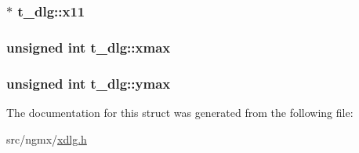 \hypertarget{structt__dlg_abc3b53346014e4a820f11e6f06450201}{
\subsubsection[{x11}]{$\ast$ {\bf t\-\_\-dlg\-::x11}}}\label{structt__dlg_abc3b53346014e4a820f11e6f06450201}
\hypertarget{structt__dlg_ad7a18e05995d04cb304b41d6fe71b3fb}{
\subsubsection[{xmax}]{\setlength{\rightskip}{0pt plus 5cm}unsigned int {\bf t\-\_\-dlg\-::xmax}}}\label{structt__dlg_ad7a18e05995d04cb304b41d6fe71b3fb}
\hypertarget{structt__dlg_a79b7b97c6c62ef28d939529945419ea9}{
\subsubsection[{ymax}]{\setlength{\rightskip}{0pt plus 5cm}unsigned int {\bf t\-\_\-dlg\-::ymax}}}\label{structt__dlg_a79b7b97c6c62ef28d939529945419ea9}


\-The documentation for this struct was generated from the following file\-:\begin{DoxyCompactItemize}
\item 
src/ngmx/\hyperlink{xdlg_8h}{xdlg.\-h}\end{DoxyCompactItemize}
